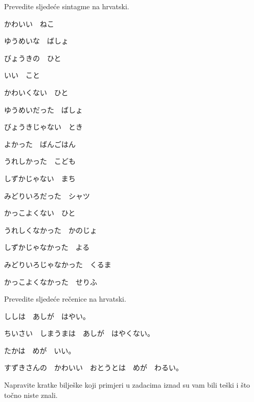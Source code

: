 
\author{autor}

	
	\begin{mondai}{Prevedite sljedeće sintagme na hrvatski.}
		\item かわいい　ねこ
		\item ゆうめいな　ばしょ
		\item びょうきの　ひと
		\item いい　こと
		
		\vspace{5pt}
		\item かわいくない　ひと
		\item ゆうめいだった　ばしょ
		\item びょうきじゃない　とき
		\item よかった　ばんごはん
		
		\vspace{5pt}
		\item うれしかった　こども
		\item しずかじゃない　まち
		\item みどりいろだった　シャツ
		\item かっこよくない　ひと
		
		\vspace{5pt}
		\item うれしくなかった　かのじょ
		\item しずかじゃなかった　よる
		\item みどりいろじゃなかった　くるま
		\item かっこよくなかった　せりふ
	\end{mondai}

	\begin{mondai}{Prevedite sljedeće rečenice na hrvatski.}
		\item ししは　あしが　はやい。
		\item ちいさい　しまうまは　あしが　はやくない。
		\item たかは　めが　いい。
		\item すずきさんの　かわいい　おとうとは　めが　わるい。
	\end{mondai}

	Napravite kratke bilješke koji primjeri u zadacima iznad su vam bili teški i što točno niste znali.

